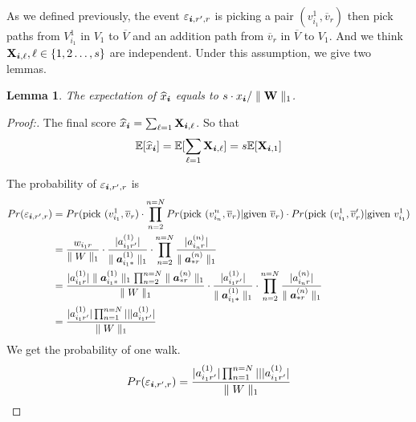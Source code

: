 \documentclass{article}
\newcommand{\Sca}[3]{{#1}^{(#2)}_{i_#2#3}}%
\newcommand{\V}[1]{{\bm{{\MakeLowercase{#1}}}}}%
\newcommand{\VnC}[3]{\V{#1}^{(#2)}_{#3}}%
\newcommand{\M}[1]{{\bm{\mathbf{\MakeUppercase{#1}}}}}%
\newcommand{\norm}[2]{\parallel#1\parallel_{#2}}
\newtheorem{lemma}{Lemma}[section]
\begin{document}
As we defined previously, the event $\varepsilon_{\V{i},r',r}$ is picking a pair $(v^1_{i_1},\overline{v}_r)$ then pick paths from $V^1_{i_1}$ in $V_1$ to $\overline{V}$ and an addition path from $\overline{v}_r$ in $\overline{V}$ to $V_1$. And we think $\M{X}_{\V{i},\ell},\ell\in\{1,2\ldots,s\}$ are independent. Under this assumption, we give two lemmas.

\begin{lemma}\label{lemma:Expectation}
The expectation of $\widehat{x}_{\V{i}}$ equals to $s\cdot x_{\V{i}}/\norm{\M{W}}{1}$.
\end{lemma}
\begin{proof}[Proof:]
The final score $\widehat{x}_{\V{i}} = \sum_{\ell=1}\M{X}_{\V{i},\ell}$. So that
\begin{equation}\label{eq:Expectation}
\mathbb{E}[\widehat{x}_{\V{i}}] = \mathbb{E}[\sum_{\ell=1}\M{X}_{\V{i},\ell}]=s\mathbb{E}[\M{X}_{\V{i},1}]
\end{equation}

The probability of $\varepsilon_{\V{i},r',r}$ is
\begin{align*}
Pr(\varepsilon_{\V{i},r',r})
&=Pr({\rm pick\ }(v^1_{i_1},\overline{v}_r)\cdot
\prod_{n=2}^{n=N}
Pr({\rm pick\ }(v^n_{i_n},\overline{v}_r)| {\rm given\ }\overline{v}_r)\cdot
Pr({\rm pick\ }(v^1_{i_1},\overline{v}_r')| {\rm given\ }v^1_{i_1})\\
&=\frac{w_{i_1r}}{\norm{W}{1}}\cdot
  \frac{|\Sca{a}{1}{r'}|}{\norm{{\VnC{a}{1}{i_1*}}}{1}}\cdot
  \prod_{n=2}^{n=N}
  \frac{|\Sca{a}{n}{r}|}{\norm{{\VnC{a}{n}{*r}}}{1}}\\
&=\frac{|\Sca{a}{1}{r}|\norm{{\VnC{a}{1}{i_1*}}}{1}\prod_{n=2}^{n=N}\norm{{\VnC{a}{n}{*r}}}{1}}{\norm{W}{1}}\cdot
  \frac{|\Sca{a}{1}{r'}|}{\norm{{\VnC{a}{1}{i_1*}}}{1}}\cdot
  \prod_{n=2}^{n=N}
  \frac{|\Sca{a}{n}{r}|}{\norm{{\VnC{a}{n}{*r}}}{1}}\\
&=\frac{|\Sca{a}{1}{r'}|\prod_{n=1}^{n=N}|||\Sca{a}{1}{r'}|}{\norm{W}{1}}
\end{align*}
We get the probability of one walk.
\begin{equation}\label{eq:ProbabilityOneWalk}
Pr(\varepsilon_{\V{i},r',r})=\frac{|\Sca{a}{1}{r'}|\prod_{n=1}^{n=N}|||\Sca{a}{1}{r'}|}{\norm{W}{1}}
\end{equation}


\end{proof}
\end{document}
